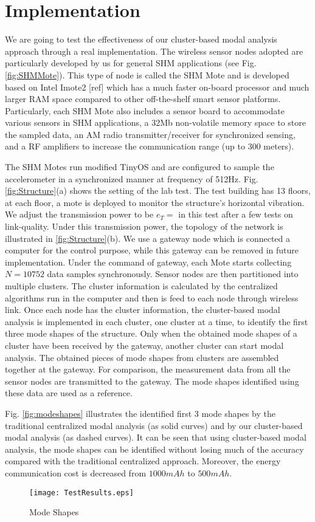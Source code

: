 \section{Implementation}
We are going to test the effectiveness of our cluster-based modal analysis approach through a real implementation. The wireless sensor nodes adopted are particularly developed by us for general SHM applications (see Fig.\ref{fig:SHMMote}). This type of node is called the SHM Mote and is developed based on Intel Imote2 [ref] which has a much faster on-board processor and much larger RAM space compared to other off-the-shelf smart sensor platforms. Particularly, each SHM Mote also includes a sensor board to accommodate various sensors in SHM applications, a 32Mb non-volatile memory space to store the sampled data, an AM radio transmitter/receiver for synchronized sensing, and a RF amplifiers to increase the communication range (up to 300 meters). 

The SHM Motes run modified TinyOS and are configured to sample the accelerometer in a synchronized manner at frequency of 512Hz. Fig. \ref{fig:Structure}(a) shows the setting of the lab test. The test building has 13 floors, at each floor, a mote is deployed to monitor the structure's horizontal vibration. We adjust the transmission power to be \(e_T =\) in this test after a few tests on link-quality. Under this transmission power, the topology of the network is illustrated in \ref{fig:Structure}(b). We use a gateway node which is connected a computer for the control purpose, while this gateway can be removed in future implementation. Under the command of gateway, each Mote starts collecting \(N = 10752\) data samples synchronously. Sensor nodes are then partitioned into multiple clusters. The cluster information is calculated by the centralized algorithms run in the computer and then is feed to each node through wireless link. Once each node has the cluster information, the cluster-based modal analysis is implemented in each cluster, one cluster at a time, to identify the first three mode shapes of the structure. Only when the obtained mode shapes of a cluster have been received by the gateway, another cluster can start modal analysis. The obtained pieces of mode shapes from clusters are assembled together at the gateway. For comparison, the measurement data from all the sensor nodes are transmitted to the gateway. The mode shapes identified using these data are used as a reference.

Fig. \ref{fig:modeshapes} illustrates the identified first 3 mode shapes by the traditional centralized modal analysis (as solid curves) and by our cluster-based modal analysis (as dashed curves). It can be seen that using cluster-based modal analysis, the mode shapes can be identified without losing much of the accuracy compared with the traditional centralized approach. Moreover, the energy communication cost is decreased from \( 1000mAh\) to \(500mAh\).

\begin{figure}
	\centering
		\texttt{[image: TestResults.eps]}
	\caption{Mode Shapes}
	\label{fig:TestResults}
\end{figure}


